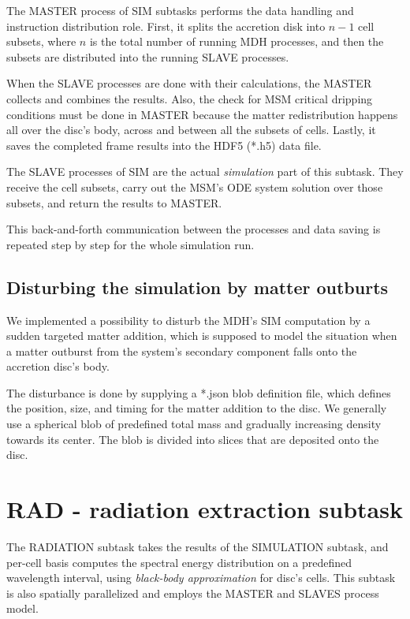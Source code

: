     The \mbox{MASTER} process of SIM subtasks performs the data handling and instruction distribution role. First, it splits the accretion disk into $n-1$ cell subsets, where $n$ is the total number of running MDH processes, and then the subsets are distributed into the running SLAVE processes.

    When the SLAVE processes are done with their calculations, the \mbox{MASTER} collects and combines the results. Also, the check for MSM critical dripping conditions must be done in \mbox{MASTER} because the matter redistribution happens all over the disc's body, across and between all the subsets of cells. Lastly, it saves the completed frame results into the HDF5 (*.h5) data file. 

    The SLAVE processes of SIM are the actual \emph{simulation} part of this subtask. They receive the cell subsets, carry out the MSM's ODE system solution over those subsets, and return the results to \mbox{MASTER}. 

    This back-and-forth communication between the processes and data saving is repeated step by step for the whole simulation run. 

\subsection{Disturbing the simulation by matter outburts}
    \label{sec:distributed_sim}
    We implemented a possibility to disturb the MDH's SIM computation by a sudden targeted matter addition, which is supposed to model the situation when a matter outburst from the system's secondary component falls onto the accretion disc's body. 

    The disturbance is done by supplying a *.json blob definition file, which defines the position, size, and timing for the matter addition to the disc. We generally use a spherical blob of predefined total mass and gradually increasing density towards its center. The blob is divided into slices that are deposited onto the disc.

\section{RAD - radiation extraction subtask}
    The RADIATION subtask takes the results of the SIMULATION subtask, and per-cell basis computes the spectral energy distribution on a predefined wavelength interval, using \emph{black-body approximation} for disc's cells. This subtask is also spatially parallelized and employs the \mbox{MASTER} and SLAVES process model.

